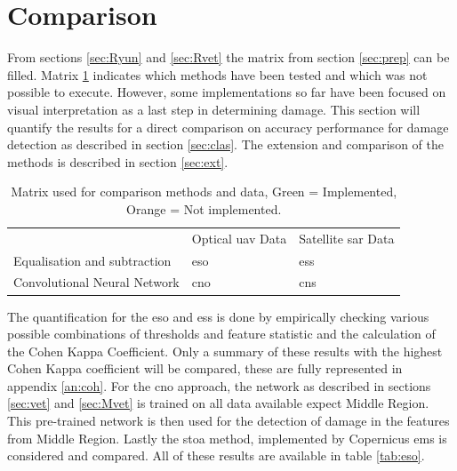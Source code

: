 \section{Comparison} \label{sec:comp}
From sections \ref{sec:Ryun} and \ref{sec:Rvet} the matrix from section \ref{sec:prep} can be filled. Matrix \ref{tab:matrConc} indicates which methods have been tested and which was not possible to execute. However, some implementations so far have been focused on visual interpretation as a last step in determining damage. This section will quantify the results for a direct comparison on accuracy performance for damage detection as described in section \ref{sec:clas}. The extension and comparison of the methods is described in section \ref{sec:ext}.\\
\begin{table} [h]
	\centering
	\captionsetup{justification=raggedright,singlelinecheck=false}
	\caption{\footnotesize{Matrix used for comparison methods and data, Green = Implemented, Orange = Not implemented.}}
	\begin{footnotesize}
		\begin{tabular}{m{2.5cm}|m{2.5cm}|m{2.5cm}|}
			\cline{2-3}
			& Optical \ac{uav} Data & Satellite \ac{sar} Data \\ \cline{2-3}
			Equalisation and subtraction & \cellcolor{JungleGreen!30} \ac{eso} & \cellcolor{JungleGreen!30} \ac{ess} \\ \hline
			Convolutional Neural Network & \cellcolor{JungleGreen!30} \ac{cno} & \cellcolor{orange!30} \ac{cns} \\ 
			\hline
		\end{tabular}
	\end{footnotesize}
	\label{tab:matrConc}
\end{table}

\noindent The quantification for the \ac{eso} and \ac{ess} is done by empirically checking various possible combinations of thresholds and feature statistic and the calculation of the Cohen Kappa Coefficient. Only a summary of these results with the highest Cohen Kappa coefficient will be compared, these are fully represented in appendix \ref{an:coh}. For the \ac{cno} approach, the network as described in sections \ref{sec:vet} and \ref{sec:Mvet} is trained on all data available expect Middle Region. This pre-trained network is then used for the detection of damage in the features from Middle Region. Lastly the \ac{stoa} method, implemented by Copernicus \ac{ems} is considered and compared. All of these results are available in table \ref{tab:eso}.\\

